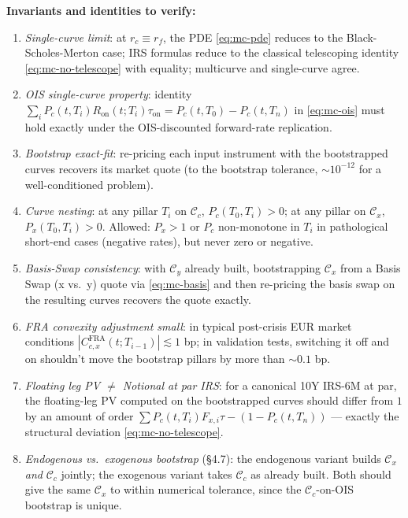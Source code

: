 \documentclass[11pt,a4paper]{article}
\begin{document}
\begin{validation}
\textbf{Invariants and identities to verify:}
\begin{enumerate}[noitemsep]
  \item \emph{Single-curve limit}: at $r_c \equiv r_f$, the PDE
        \eqref{eq:mc-pde} reduces to the Black-Scholes-Merton case;
        IRS formulas reduce to the classical telescoping identity
        \eqref{eq:mc-no-telescope} with equality; multicurve and
        single-curve agree.
  \item \emph{OIS single-curve property}: identity
        $\sum_i P_c(t, T_i) R_{\text{on}}(t; T_i) \tau_{\text{on}} =
        P_c(t, T_0) - P_c(t, T_n)$ in \eqref{eq:mc-ois} must hold
        exactly under the OIS-discounted forward-rate replication.
  \item \emph{Bootstrap exact-fit}: re-pricing each input instrument
        with the bootstrapped curves recovers its market quote (to
        the bootstrap tolerance, $\sim 10^{-12}$ for a well-conditioned
        problem).
  \item \emph{Curve nesting}: at any pillar $T_i$ on $\mathcal{C}_c$,
        $P_c(T_0, T_i) > 0$; at any pillar on $\mathcal{C}_x$,
        $P_x(T_0, T_i) > 0$. Allowed: $P_x > 1$ or
        $P_c$ non-monotone in $T_i$ in pathological short-end cases
        (negative rates), but never zero or negative.
  \item \emph{Basis-Swap consistency}: with $\mathcal{C}_y$ already
        built, bootstrapping $\mathcal{C}_x$ from a Basis Swap (x
        vs.\ y) quote via \eqref{eq:mc-basis} and then re-pricing
        the basis swap on the resulting curves recovers the quote
        exactly.
  \item \emph{FRA convexity adjustment small}: in typical
        post-crisis EUR market conditions
        $|C^{\text{FRA}}_{c,x}(t; T_{i-1})| \lesssim 1$ bp; in
        validation tests, switching it off and on shouldn't move
        the bootstrap pillars by more than $\sim 0.1$ bp.
  \item \emph{Floating leg PV $\ne$ Notional at par IRS}: for a
        canonical 10Y IRS-6M at par, the floating-leg PV computed
        on the bootstrapped curves should differ from $1$ by an
        amount of order $\sum P_c(t, T_i) F_{x,i} \tau - (1 - P_c(t, T_n))$
        --- exactly the structural deviation
        \eqref{eq:mc-no-telescope}.
  \item \emph{Endogenous vs.\ exogenous bootstrap} (\S4.7): the
        endogenous variant builds $\mathcal{C}_x$ \emph{and}
        $\mathcal{C}_c$ jointly; the exogenous variant takes
        $\mathcal{C}_c$ as already built. Both should give the same
        $\mathcal{C}_x$ to within numerical tolerance, since the
        $\mathcal{C}_c$-on-OIS bootstrap is unique.
\end{enumerate}
\end{validation}
\end{document}
